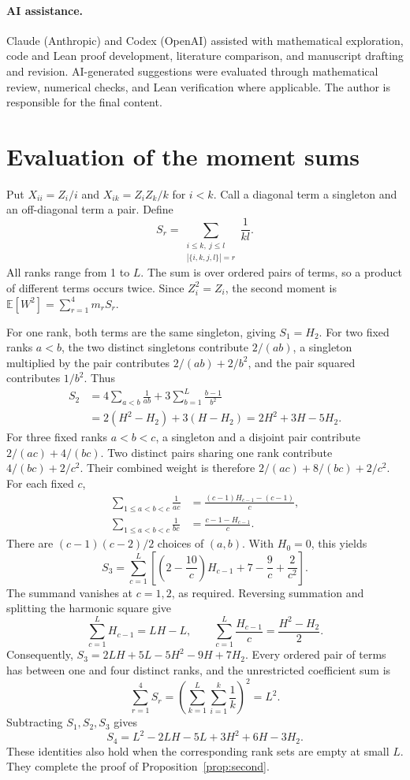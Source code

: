 \documentclass[10pt]{article}
\newcommand{\E}{\mathbb{E}}
\begin{document}
\paragraph{AI assistance.}
Claude (Anthropic) and Codex (OpenAI) assisted with mathematical exploration, code and Lean proof development, literature comparison, and manuscript drafting and revision.
AI-generated suggestions were evaluated through mathematical review, numerical checks, and Lean verification where applicable.
The author is responsible for the final content.

\clearpage
\appendix
\section{Evaluation of the moment sums}\label{app:sums}
Put $X_{ii}=Z_i/i$ and $X_{ik}=Z_iZ_k/k$ for $i<k$.
Call a diagonal term a singleton and an off-diagonal term a pair.
Define
\[
 S_r=\sum_{\substack{i\le k,\ j\le l\\|\{i,k,j,l\}|=r}}\frac1{kl}.
\]
All ranks range from 1 to $L$.
The sum is over ordered pairs of terms, so a product of different terms occurs twice.
Since $Z_i^2=Z_i$, the second moment is $\E[W^2]=\sum_{r=1}^4m_rS_r$.

For one rank, both terms are the same singleton, giving $S_1=H_2$.
For two fixed ranks $a<b$, the two distinct singletons contribute $2/(ab)$, a singleton multiplied by the pair contributes $2/(ab)+2/b^2$, and the pair squared contributes $1/b^2$.
Thus
\begin{align*}
 S_2&=4\sum_{a<b}\frac1{ab}+3\sum_{b=1}^L\frac{b-1}{b^2}\\
 &=2(H^2-H_2)+3(H-H_2)=2H^2+3H-5H_2.
\end{align*}
For three fixed ranks $a<b<c$, a singleton and a disjoint pair contribute $2/(ac)+4/(bc)$.
Two distinct pairs sharing one rank contribute $4/(bc)+2/c^2$.
Their combined weight is therefore $2/(ac)+8/(bc)+2/c^2$.
For each fixed $c$,
\begin{align*}
 \sum_{1\le a<b<c}\frac1{ac}
 &=\frac{(c-1)H_{c-1}-(c-1)}c,\\
 \sum_{1\le a<b<c}\frac1{bc}
 &=\frac{c-1-H_{c-1}}c.
\end{align*}
There are $(c-1)(c-2)/2$ choices of $(a,b)$.
With $H_0=0$, this yields
\[
 S_3=\sum_{c=1}^L\left[\left(2-\frac{10}c\right)H_{c-1}+7-\frac9c+\frac2{c^2}\right].
\]
The summand vanishes at $c=1,2$, as required.
Reversing summation and splitting the harmonic square give
\[
 \sum_{c=1}^LH_{c-1}=LH-L,
 \qquad\sum_{c=1}^L\frac{H_{c-1}}c=\frac{H^2-H_2}2.
\]
Consequently, $S_3=2LH+5L-5H^2-9H+7H_2$.
Every ordered pair of terms has between one and four distinct ranks, and the unrestricted coefficient sum is
\[
 \sum_{r=1}^4S_r=\left(\sum_{k=1}^L\sum_{i=1}^k\frac1k\right)^2=L^2.
\]
Subtracting $S_1,S_2,S_3$ gives
\[
 S_4=L^2-2LH-5L+3H^2+6H-3H_2.
\]
These identities also hold when the corresponding rank sets are empty at small $L$.
They complete the proof of Proposition~\ref{prop:second}.
\end{document}
